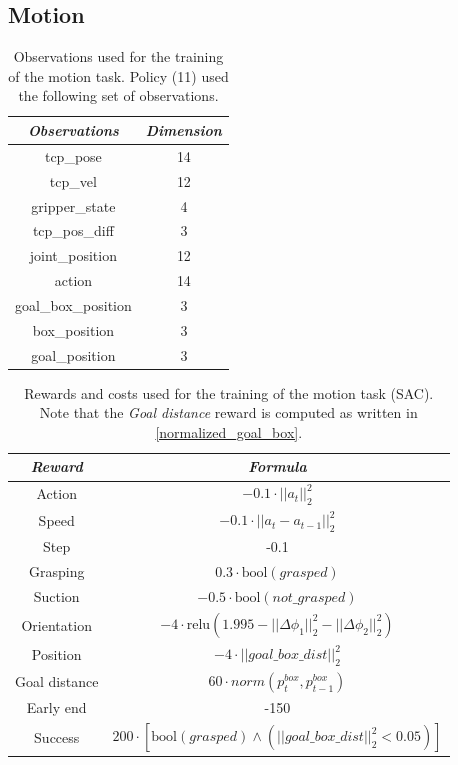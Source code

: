 \documentclass[letterpaper, 10 pt, conference]{ieeeconf}  %
\begin{document}
\subsection{Motion}

\begin{table}[H]
    \centering
    \caption{Observations used for the training of the motion task. Policy (11) used the following set of observations.}
    \renewcommand{\arraystretch}{1.5}
    \begin{tabular}{c|c}
    \toprule \textit{\textbf{Observations}} & \textit{\textbf{Dimension}} \\
    \midrule tcp\_pose & 14 \\
    tcp\_vel & 12 \\
    gripper\_state & 4 \\
    tcp\_pos\_diff & 3 \\
    joint\_position & 12 \\
    action & 14 \\
    goal\_box\_position & 3 \\
    box\_position & 3 \\
    goal\_position & 3 \\
    \bottomrule
    \end{tabular}
    \label{motion_obs_sac}
\end{table}

\begin{table}[H]
    \centering
    \caption{Rewards and costs used for the training of the motion task (SAC). Note that the \textit{Goal distance} reward is computed as written in \cref{normalized_goal_box}.}
    \renewcommand{\arraystretch}{1.5}
    \begin{tabular}{c|c}
    \toprule \textbf{\textit{Reward}} & \textbf{\textit{Formula}}\\
    \midrule Action & $-0.1\cdot || a_{t} ||^2_2$\\
    Speed & $-0.1\cdot ||a_t - a_{t-1}||^2_2$\\
    Step & -0.1\\
    Grasping & $0.3\cdot \text{bool}(grasped) $\\
    Suction & $-0.5\cdot \text{bool}(not\_grasped)$\\
    Orientation & $-4\cdot \text{relu}(1.995 - ||\Delta\phi_{1}||^2_2 - ||\Delta\phi_{2}||^2_2)$\\
    Position & $-4\cdot ||goal\_box\_dist||^2_2$\\
    Goal distance & $60\cdot norm(p^{box}_t, p^{box}_{t-1})$\\    
    Early end & -150\\
    Success & $200\cdot [\text{bool}(grasped)\land (||goal\_box\_dist||^2_2 <0.05)]$\\
    \bottomrule
    \end{tabular}
    \label{motion_rew_sac}
\end{table}
\end{document}
